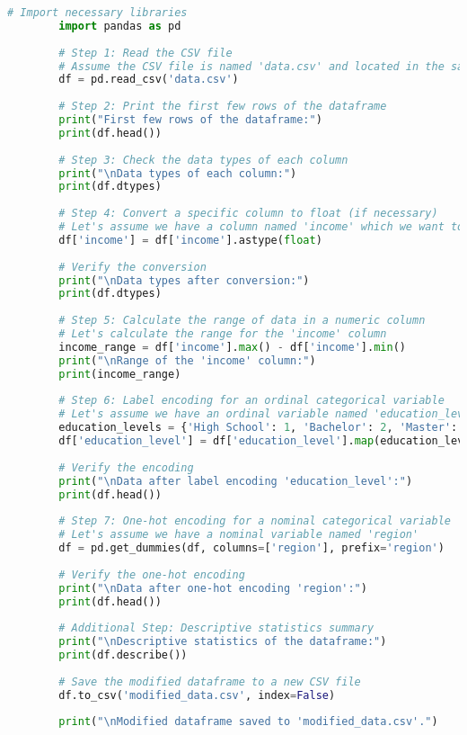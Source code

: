 \begin{lstlisting}[language=Python]
        # Import necessary libraries
        import pandas as pd
        
        # Step 1: Read the CSV file
        # Assume the CSV file is named 'data.csv' and located in the same directory as the script
        df = pd.read_csv('data.csv')
        
        # Step 2: Print the first few rows of the dataframe
        print("First few rows of the dataframe:")
        print(df.head())
        
        # Step 3: Check the data types of each column
        print("\nData types of each column:")
        print(df.dtypes)
        
        # Step 4: Convert a specific column to float (if necessary)
        # Let's assume we have a column named 'income' which we want to convert to float
        df['income'] = df['income'].astype(float)
        
        # Verify the conversion
        print("\nData types after conversion:")
        print(df.dtypes)
        
        # Step 5: Calculate the range of data in a numeric column
        # Let's calculate the range for the 'income' column
        income_range = df['income'].max() - df['income'].min()
        print("\nRange of the 'income' column:")
        print(income_range)
        
        # Step 6: Label encoding for an ordinal categorical variable
        # Let's assume we have an ordinal variable named 'education_level'
        education_levels = {'High School': 1, 'Bachelor': 2, 'Master': 3, 'PhD': 4}
        df['education_level'] = df['education_level'].map(education_levels)
        
        # Verify the encoding
        print("\nData after label encoding 'education_level':")
        print(df.head())
        
        # Step 7: One-hot encoding for a nominal categorical variable
        # Let's assume we have a nominal variable named 'region'
        df = pd.get_dummies(df, columns=['region'], prefix='region')
        
        # Verify the one-hot encoding
        print("\nData after one-hot encoding 'region':")
        print(df.head())
        
        # Additional Step: Descriptive statistics summary
        print("\nDescriptive statistics of the dataframe:")
        print(df.describe())
        
        # Save the modified dataframe to a new CSV file
        df.to_csv('modified_data.csv', index=False)
        
        print("\nModified dataframe saved to 'modified_data.csv'.")        
\end{lstlisting}

